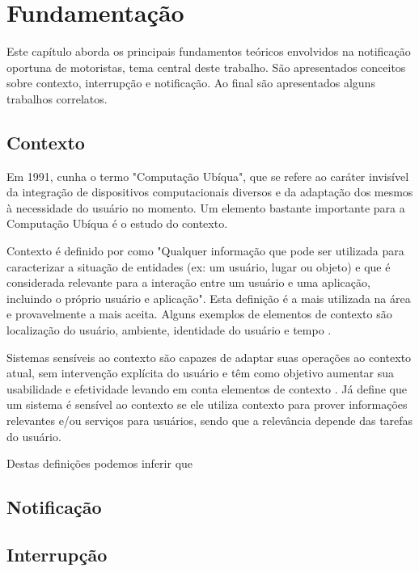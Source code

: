 \chapter{Fundamentação}
\label{fundamentacao}
Este capítulo aborda os principais fundamentos teóricos envolvidos na notificação oportuna de motoristas,
tema central deste trabalho. São apresentados conceitos sobre contexto, interrupção e notificação.
Ao final são apresentados alguns trabalhos correlatos.

\section{Contexto}
\label{contexto}
Em 1991, \cite{weiser1991computer} cunha o termo "Computação Ubíqua", que se refere ao caráter invisível da
integração de dispositivos computacionais diversos e da adaptação dos mesmos à necessidade do usuário no momento.
Um elemento bastante importante para a Computação Ubíqua é o estudo do contexto.

Contexto é definido por \cite{dey2001understanding} como "Qualquer informação que pode ser utilizada para
caracterizar a situação de entidades (ex: um usuário, lugar ou objeto) e que é considerada relevante para
a interação entre um usuário e uma aplicação, incluindo o próprio usuário e aplicação". Esta definição é
a mais utilizada na área e provavelmente a mais aceita. Alguns exemplos de elementos de contexto são
localização do usuário, ambiente, identidade do usuário e tempo \cite{ryan1999enhanced}.

Sistemas sensíveis ao contexto são capazes de adaptar suas operações ao contexto atual, sem intervenção
explícita do usuário e têm como objetivo aumentar sua usabilidade e efetividade levando em conta elementos
de contexto \cite{baldauf2007survey}. Já \cite{abowd1999towards} define que um sistema é sensível ao contexto
se ele utiliza contexto para prover informações relevantes e/ou serviços para usuários, sendo que a relevância
depende das tarefas do usuário.

Destas definições podemos inferir que 

\section{Notificação}
\label{notificacao}

\section{Interrupção}
\label{interrupcao}
